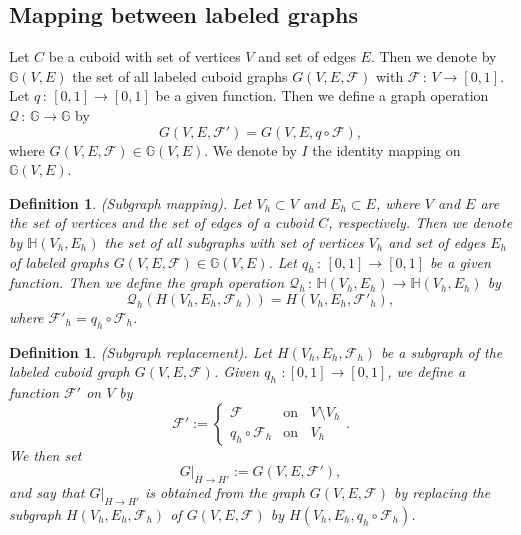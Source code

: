 \documentclass[a4paper,11pt]{article}
\newtheorem{definition}[theorem]{Definition}
\begin{document}
\subsection{Mapping between labeled graphs}
Let $C$ be a cuboid with set of vertices $V$ and set of edges $E$. Then we denote by $\mathbb{G}(V,E)$
the set of all labeled cuboid graphs $G(V,E,\mathcal{F})$ with $\mathcal{F}\,:\,V\longrightarrow [0,1]$.
Let $q\,:\,[0,1]\longrightarrow [0,1]$ be a given function. Then we define a graph operation
$\mathcal{Q}\,:\,\mathbb{G}\longrightarrow\mathbb{G}$ by
\begin{equation}
G(V,E,\mathcal{F}')=G(V,E,q\circ\mathcal{F}),
\label{eq:labeled-graph-3}
\end{equation}
where $G(V,E,\mathcal{F})\in \mathbb{G}(V,E)$. We denote by $I$ the identity
mapping on $\mathbb{G}(V,E)$.

\begin{definition}(Subgraph mapping). Let $V_h\subset V$ and $E_h\subset E$, where $V$ and $E$ are the set
of vertices and the set of edges of a cuboid $C$, respectively. Then we denote by $\mathbb{H}(V_h,E_h)$ the
set of all subgraphs with set of vertices $V_h$ and set of edges $E_h$ of labeled graphs
$G(V,E,\mathcal{F})\in\mathbb{G}(V,E)$. Let $q_h\,:\,[0,1]\longrightarrow [0,1]$ be a given function.
Then we define the graph operation $\mathcal{Q}_h\,:\,
\mathbb{H}(V_h,E_h)\longrightarrow\mathbb{H}(V_h,E_h)$ by
\begin{equation}
\mathcal{Q}_h(H(V_h,E_h,\mathcal{F}_h))=H(V_h,E_h,\mathcal{F}'_h),
\label{eq:labeled-graph-6}
\end{equation}
where $\mathcal{F}'_h=q_h\circ\mathcal{F}_h$.
\label{def:labeled-graph-2}
\end{definition}

\begin{definition}(Subgraph replacement). Let $H(V_h,E_h,\mathcal{F}_h)$ be a subgraph of the labeled cuboid
graph $G(V,E,\mathcal{F})$. Given $q_h\,\,:[0,1]\longrightarrow [0,1]$, we define a function $\mathcal{F}'$
on $V$ by
\begin{equation}
\mathcal{F}':=\left\{
   \begin{array}{ll}
     \mathcal{F} & \mbox{on }\;\; V\setminus V_h \\
     q_h\circ\mathcal{F}_h & \mbox{on }\;\; V_h
   \end{array}\right..
\label{eq:labeled-graph-7}
\end{equation}
We then set
\begin{equation}
G|_{H\rightarrow H'}:=G(V,E,\mathcal{F}'),
\label{eq:labeled-graph-8}
\end{equation}
and say that $G|_{H\rightarrow H'}$ is obtained from the graph $G(V,E,\mathcal{F})$ by replacing
the subgraph $H(V_h,E_h,\mathcal{F}_h)$ of $G(V,E,\mathcal{F})$ by $H(V_h,E_h,q_h\circ\mathcal{F}_h)$.
\label{def:labeled-graph-3}
\end{definition}
\end{document}
